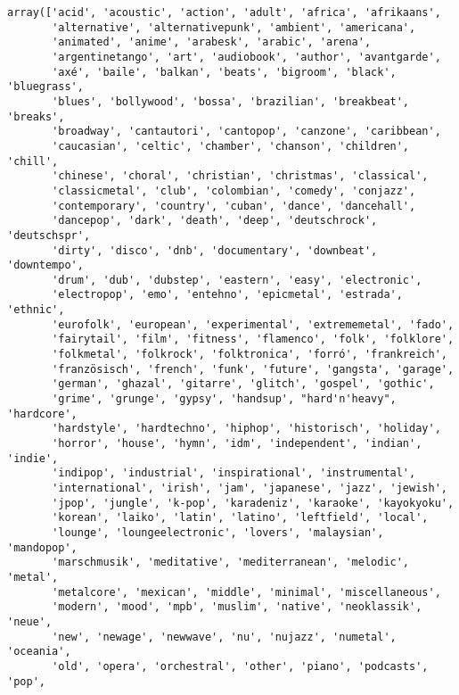 \documentclass[11pt]{article}
\makeatletter
\newcommand{\boxspacing}{\kern\kvtcb@left@rule\kern\kvtcb@boxsep}
\newcommand{\prompt}[4]{
        {\ttfamily\llap{{\color{#2}[#3]:\hspace{3pt}#4}}\vspace{-\baselineskip}}
    }
\makeatother
\begin{document}
            \begin{tcolorbox}[breakable, size=fbox, boxrule=.5pt, pad at break*=1mm, opacityfill=0]
\prompt{Out}{outcolor}{12}{\boxspacing}
\begin{Verbatim}[commandchars=\\\{\}]
array(['acid', 'acoustic', 'action', 'adult', 'africa', 'afrikaans',
       'alternative', 'alternativepunk', 'ambient', 'americana',
       'animated', 'anime', 'arabesk', 'arabic', 'arena',
       'argentinetango', 'art', 'audiobook', 'author', 'avantgarde',
       'axé', 'baile', 'balkan', 'beats', 'bigroom', 'black', 'bluegrass',
       'blues', 'bollywood', 'bossa', 'brazilian', 'breakbeat', 'breaks',
       'broadway', 'cantautori', 'cantopop', 'canzone', 'caribbean',
       'caucasian', 'celtic', 'chamber', 'chanson', 'children', 'chill',
       'chinese', 'choral', 'christian', 'christmas', 'classical',
       'classicmetal', 'club', 'colombian', 'comedy', 'conjazz',
       'contemporary', 'country', 'cuban', 'dance', 'dancehall',
       'dancepop', 'dark', 'death', 'deep', 'deutschrock', 'deutschspr',
       'dirty', 'disco', 'dnb', 'documentary', 'downbeat', 'downtempo',
       'drum', 'dub', 'dubstep', 'eastern', 'easy', 'electronic',
       'electropop', 'emo', 'entehno', 'epicmetal', 'estrada', 'ethnic',
       'eurofolk', 'european', 'experimental', 'extrememetal', 'fado',
       'fairytail', 'film', 'fitness', 'flamenco', 'folk', 'folklore',
       'folkmetal', 'folkrock', 'folktronica', 'forró', 'frankreich',
       'französisch', 'french', 'funk', 'future', 'gangsta', 'garage',
       'german', 'ghazal', 'gitarre', 'glitch', 'gospel', 'gothic',
       'grime', 'grunge', 'gypsy', 'handsup', "hard'n'heavy", 'hardcore',
       'hardstyle', 'hardtechno', 'hiphop', 'historisch', 'holiday',
       'horror', 'house', 'hymn', 'idm', 'independent', 'indian', 'indie',
       'indipop', 'industrial', 'inspirational', 'instrumental',
       'international', 'irish', 'jam', 'japanese', 'jazz', 'jewish',
       'jpop', 'jungle', 'k-pop', 'karadeniz', 'karaoke', 'kayokyoku',
       'korean', 'laiko', 'latin', 'latino', 'leftfield', 'local',
       'lounge', 'loungeelectronic', 'lovers', 'malaysian', 'mandopop',
       'marschmusik', 'meditative', 'mediterranean', 'melodic', 'metal',
       'metalcore', 'mexican', 'middle', 'minimal', 'miscellaneous',
       'modern', 'mood', 'mpb', 'muslim', 'native', 'neoklassik', 'neue',
       'new', 'newage', 'newwave', 'nu', 'nujazz', 'numetal', 'oceania',
       'old', 'opera', 'orchestral', 'other', 'piano', 'podcasts', 'pop',

\end{Verbatim}
\end{tcolorbox}
\end{document}
